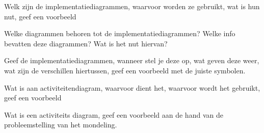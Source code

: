 \begin{question}
Welk zijn de implementatiediagrammen, waarvoor worden ze gebruikt, wat is hun nut, geef een voorbeeld
\end{question}

\begin{solution}[print]

\end{solution}
\begin{question}
Welke diagrammen behoren tot de implementatiediagrammen? Welke info bevatten deze diagrammen? Wat is het nut hiervan?
\end{question}

\begin{solution}[print]

\end{solution}

\begin{question}
Geef de implementatiediagrammen, wanneer stel je deze op, wat geven deze weer, wat zijn de verschillen hiertussen, geef een voorbeeld met de juiste symbolen.
\end{question}

\begin{solution}[print]

\end{solution}

\begin{question}
Wat is aan activiteitendiagram, waarvoor dient het, waarvoor wordt het gebruikt, geef een voorbeeld
\end{question}

\begin{solution}[print]

\end{solution}

\begin{question}
Wat is een activiteits diagram, geef een voorbeeld aan de hand van de probleemstelling van het mondeling.
\end{question}

